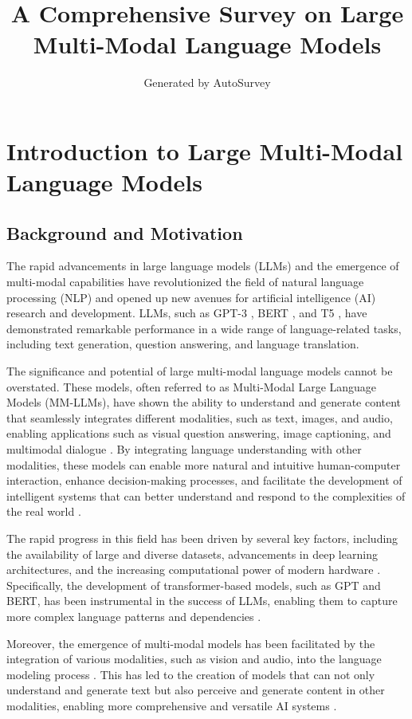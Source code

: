 \documentclass[11pt]{article}
\title{A Comprehensive Survey on Large Multi-Modal Language Models}
\author{Generated by AutoSurvey}
\date{}
\begin{document}
\maketitle
\tableofcontents
\newpage

\section{Introduction to Large Multi-Modal Language Models}

\subsection{Background and Motivation}

The rapid advancements in large language models (LLMs) and the emergence of multi-modal capabilities have revolutionized the field of natural language processing (NLP) and opened up new avenues for artificial intelligence (AI) research and development. LLMs, such as GPT-3 \cite{ref1}, BERT \cite{ref2}, and T5 \cite{ref3}, have demonstrated remarkable performance in a wide range of language-related tasks, including text generation, question answering, and language translation.

The significance and potential of large multi-modal language models cannot be overstated. These models, often referred to as Multi-Modal Large Language Models (MM-LLMs), have shown the ability to understand and generate content that seamlessly integrates different modalities, such as text, images, and audio, enabling applications such as visual question answering, image captioning, and multimodal dialogue \cite{ref4,ref5}. By integrating language understanding with other modalities, these models can enable more natural and intuitive human-computer interaction, enhance decision-making processes, and facilitate the development of intelligent systems that can better understand and respond to the complexities of the real world \cite{ref6}.

The rapid progress in this field has been driven by several key factors, including the availability of large and diverse datasets, advancements in deep learning architectures, and the increasing computational power of modern hardware \cite{ref7}. Specifically, the development of transformer-based models, such as GPT and BERT, has been instrumental in the success of LLMs, enabling them to capture more complex language patterns and dependencies \cite{ref8}.

Moreover, the emergence of multi-modal models has been facilitated by the integration of various modalities, such as vision and audio, into the language modeling process \cite{ref9}. This has led to the creation of models that can not only understand and generate text but also perceive and generate content in other modalities, enabling more comprehensive and versatile AI systems \cite{ref10}.
\end{document}
